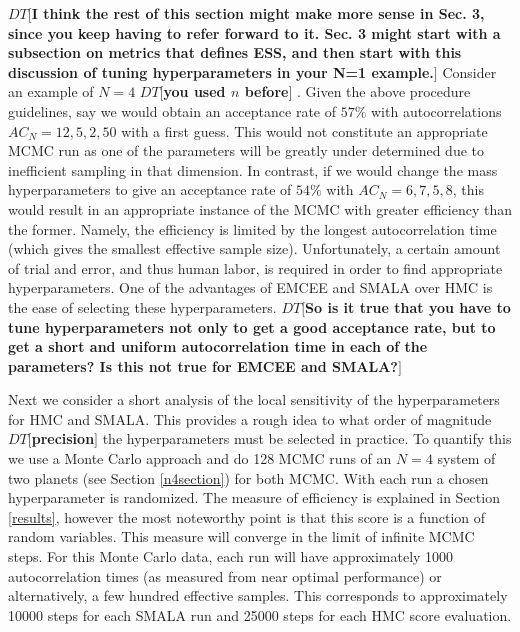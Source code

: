 \documentclass{aa}
\def\memodt#1{\color{green}$DT[${\bf #1}$]$ \color{black}}
\begin{document}
\memodt{I think the rest of this section might make more sense in Sec. 3, since you keep having to refer forward to it. Sec. 3 might start with a subsection on metrics that defines ESS, and then start with this discussion of tuning hyperparameters in your N=1 example.}
Consider an example of $N=4$ \memodt{you used $n$ before}. 
Given the above procedure guidelines, say we would obtain an acceptance rate of $57\%$ with autocorrelations $AC_N = 12, 5, 2, 50$ with a first guess.
This would not constitute an appropriate MCMC run as one of the parameters will be greatly under determined due to inefficient sampling in that dimension. 
In contrast, if we would change the mass hyperparameters to give an acceptance rate of $54\%$ with $AC_N = 6, 7, 5, 8$, this would result in an appropriate instance of the MCMC with greater efficiency than the former. 
Namely, the efficiency is limited by the longest autocorrelation time (which gives the smallest effective sample size). 
Unfortunately, a certain amount of trial and error, and thus human labor, is required in order to find appropriate hyperparameters. 
One of the advantages of EMCEE and SMALA over HMC is the ease of selecting these hyperparameters. \memodt{So is it true that you have to tune hyperparameters not only to get a good acceptance rate, but to get a short and uniform autocorrelation time in each of the parameters? Is this not true for EMCEE and SMALA?}

Next we consider a short analysis of the local sensitivity of the hyperparameters for HMC and SMALA. 
This provides a rough idea to what order of magnitude \memodt{precision} the hyperparameters must be selected in practice. 
To quantify this we use a Monte Carlo approach and do 128 MCMC runs of an $N=4$ system of two planets (see Section \ref{n4section}) for both MCMC.
With each run a chosen hyperparameter is randomized. The measure of efficiency is explained in Section \ref{results}, however the most noteworthy point is that this score is a function of random variables. 
This measure will converge in the limit of infinite MCMC steps. 
For this Monte Carlo data, each run will have approximately 1000 autocorrelation times (as measured from near optimal performance) or alternatively, a few hundred effective samples. 
This corresponds to approximately 10000 steps for each SMALA run and 25000 steps for each HMC score evaluation. 
\end{document}
